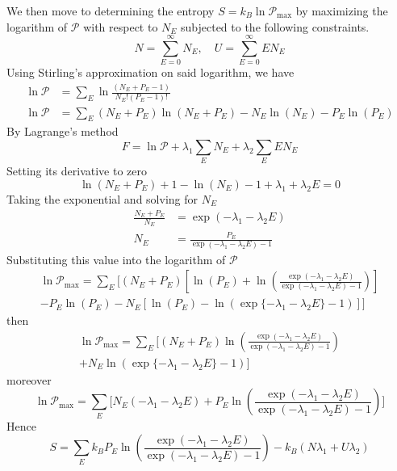 \documentclass[../../../Main.tex]{subfiles}
\begin{document}
We then move to determining the entropy $S=k_B \ln \mathcal{P}_{\max}$ by maximizing the logarithm of $\mathcal{P}$ with respect to $N_E$ subjected to the following constraints.
\begin{equation*}
    N=\sum_{E=0}^{\infty}N_E,\quad U=\sum_{E=0}^{\infty}EN_E
\end{equation*}
Using Stirling's approximation on said logarithm, we have 
\begin{align*}
    \ln \mathcal{P}&=\sum_{E}\ln\frac{(N_E+P_E-1)}{N_E! (P_E-1)!}\\
    \ln \mathcal{P}&=\sum_E (N_E+P_E)\ln (N_E+P_E)-N_E\ln(N_E)- P_E \ln (P_E)
\end{align*}
By Lagrange's method
\begin{equation*}
    F=\ln \mathcal{P} +\lambda_1\sum_{E} N_E +\lambda_2\sum_{E}EN_E
\end{equation*}
Setting its derivative to zero
\begin{equation*}
    \ln (N_E+P_E)+1-\ln (N_E)-1+\lambda_1+\lambda_2E=0
\end{equation*}
Taking the exponential and solving for $N_E$
\begin{align*}
    \frac{N_E+P_E}{N_E}&=\exp(-\lambda_1-\lambda_2E)\\
    N_E&=\frac{P_E}{\exp(-\lambda_1-\lambda_2E)-1}
\end{align*}
Substituting this value into the logarithm of $\mathcal{P}$
\begin{multline*}
    \ln \mathcal{P}_{\max}=\sum_E\Bigg[ (N_E+P_E)\left[\ln (P_E)+\ln\left(\frac{\exp(-\lambda_1-\lambda_2E)}{\exp(-\lambda_1-\lambda_2E)-1}\right)\right]\\
    - P_E \ln (P_E)-N_E\left[\ln(P_E)-\ln\left(\exp \{-\lambda_1-\lambda_2E\}-1\right)\right] \Bigg]
\end{multline*}
then 
\begin{multline*}
    \ln \mathcal{P}_{\max}=\sum_E \Bigg[ (N_E+P_E)\ln\left(\frac{\exp(-\lambda_1-\lambda_2E)}{\exp(-\lambda_1-\lambda_2E)-1}\right)\\
    + N_E\ln\left(\exp \{-\lambda_1-\lambda_2E\}-1\right)\Bigg]
\end{multline*}
moreover
\begin{equation*}
    \ln \mathcal{P}_{\max}=\sum_E \Bigg[ N_E \left(-\lambda_1-\lambda_2E\right)
    + P_E\ln\left(\frac{\exp(-\lambda_1-\lambda_2E)}{\exp(-\lambda_1-\lambda_2E)-1}\right) \Bigg]
\end{equation*}
Hence
\begin{equation*}
    S=\sum_E k_B P_E\ln\left(\frac{\exp(-\lambda_1-\lambda_2E)}{\exp(-\lambda_1-\lambda_2E)-1}\right)-k_B(N\lambda_1+U\lambda_2)
\end{equation*}
\end{document}
